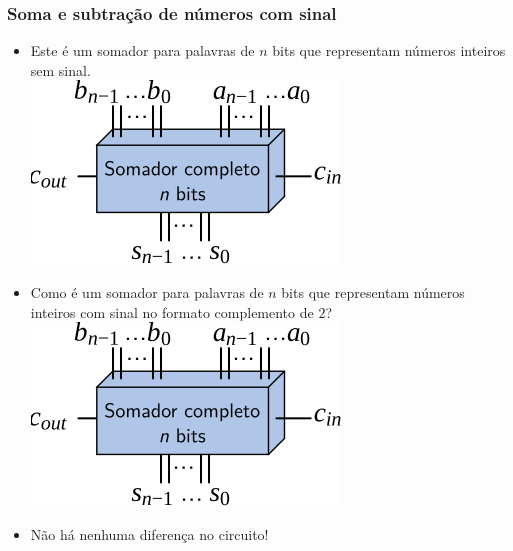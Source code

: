 \documentclass{beamer}
\begin{document}

\begin{frame}
\frametitle{Soma e subtração de números com sinal}

\begin{itemize}
\item Este é um somador para palavras de $n$ bits que representam
números inteiros sem sinal.\\
{\centering%
\includegraphics{images/fulladder_Nbits_blackbox}\\}
\item Como é um somador para palavras de $n$ bits que representam
números inteiros com sinal no formato complemento de $2$?\\[8pt]
\pause
{\centering%
\includegraphics{images/fulladder_Nbits_blackbox}\\}
\pause
\item Não há nenhuma diferença no circuito!
\end{itemize}

\end{frame}

\end{document}
